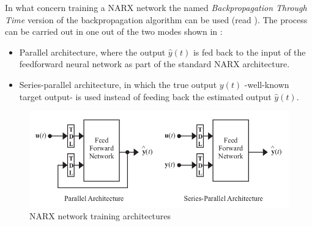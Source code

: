 
In what concern training a NARX network the named \emph{Backpropagation Through Time} version of the backpropagation algorithm can be used (read ). The process can be carried out in one out of the two modes shown in  \cite{menezes2008long}: 
\begin{itemize}
	\item Parallel architecture, 
	where the output $\hat{y}(t)$ is fed back to the input of the feedforward neural network as part of the standard NARX architecture.
	\item Series-parallel architecture, 
	in which the true output $y(t)$ -well-known target output- is used instead of feeding back the estimated output $\hat{y}(t)$.
\end{itemize}

\begin{figure}[!ht]
\centering
\includegraphics[width=\textwidth]{images/narxTrainingArchitectures.png}
\caption{NARX network training architectures}
\label{fig:narxtrainingarch}
\end{figure}



